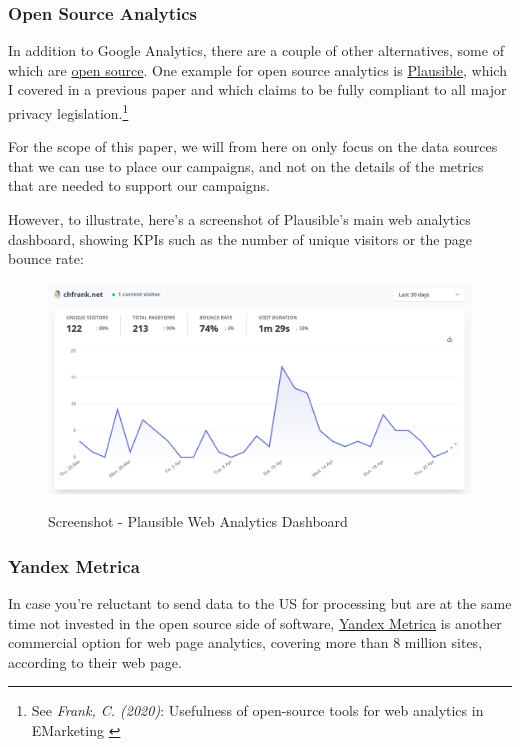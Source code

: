 \subsubsection{Open Source Analytics}

In addition to Google Analytics, there are a couple of other alternatives, some of which are \href{https://opensource.org/osd}{open source}. One example for open source analytics is \href{https://plausible.io/}{Plausible}, which I covered in a previous paper and which claims to be fully compliant to all major privacy legislation.\footnote{See \textit{Frank, C. (2020)}: Usefulness of open-source tools for web analytics in EMarketing \cite{previousPaper}} 

For the scope of this paper, we will from here on only focus on the data sources that we can use to place our campaigns, and not on the details of the metrics that are needed to support our campaigns.

However, to illustrate, here's a screenshot of Plausible's main web analytics dashboard, showing KPIs such as the number of unique visitors or the page bounce rate:

\begin{figure}[H]
\centering
\caption {Screenshot - Plausible Web Analytics Dashboard}
\includegraphics[width=\linewidth]{images/plausible.png}
\label{fig:plausible}
\end{figure}

\subsubsection{Yandex Metrica}

In case you're reluctant to send data to the US for processing but are at the same time not invested in the open source side of software, \href{https://metrica.yandex.com/}{Yandex Metrica} is another commercial option for web page analytics, covering more than 8 million sites, according to their web page.

